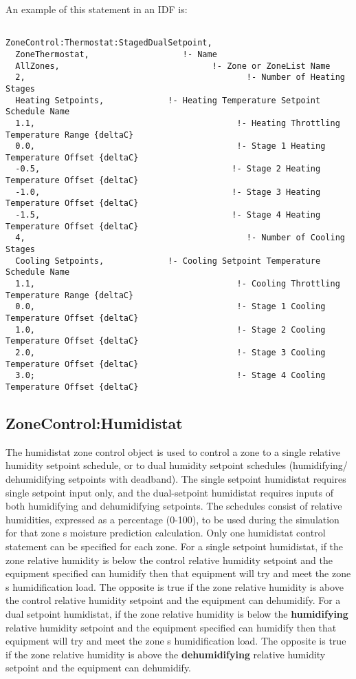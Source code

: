 An example of this statement in an IDF is:

\begin{lstlisting}

ZoneControl:Thermostat:StagedDualSetpoint,
  ZoneThermostat,                   !- Name
  AllZones,                               !- Zone or ZoneList Name
  2,                                             !- Number of Heating Stages
  Heating Setpoints,             !- Heating Temperature Setpoint Schedule Name
  1.1,                                         !- Heating Throttling Temperature Range {deltaC}
  0.0,                                         !- Stage 1 Heating Temperature Offset {deltaC}
  -0.5,                                       !- Stage 2 Heating Temperature Offset {deltaC}
  -1.0,                                       !- Stage 3 Heating Temperature Offset {deltaC}
  -1.5,                                       !- Stage 4 Heating Temperature Offset {deltaC}
  4,                                             !- Number of Cooling Stages
  Cooling Setpoints,             !- Cooling Setpoint Temperature Schedule Name
  1.1,                                         !- Cooling Throttling Temperature Range {deltaC}
  0.0,                                         !- Stage 1 Cooling Temperature Offset {deltaC}
  1.0,                                         !- Stage 2 Cooling Temperature Offset {deltaC}
  2.0,                                         !- Stage 3 Cooling Temperature Offset {deltaC}
  3.0;                                         !- Stage 4 Cooling Temperature Offset {deltaC}
\end{lstlisting}

\subsection{ZoneControl:Humidistat}\label{zonecontrolhumidistat}

The humidistat zone control object is used to control a zone to a single relative humidity setpoint schedule, or to dual humidity setpoint schedules (humidifying/ dehumidifying setpoints with deadband). The single setpoint humidistat requires single setpoint input only, and the dual-setpoint humidistat requires inputs of both humidifying and dehumidifying setpoints. The schedules consist of relative humidities, expressed as a percentage (0-100), to be used during the simulation for that zone s moisture prediction calculation. Only one humidistat control statement can be specified for each zone. For a single setpoint humidistat, if the zone relative humidity is below the control relative humidity setpoint and the equipment specified can humidify then that equipment will try and meet the zone s humidification load. The opposite is true if the zone relative humidity is above the control relative humidity setpoint and the equipment can dehumidify. For a dual setpoint humidistat, if the zone relative humidity is below the \textbf{humidifying} relative humidity setpoint and the equipment specified can humidify then that equipment will try and meet the zone s humidification load. The opposite is true if the zone relative humidity is above the \textbf{dehumidifying} relative humidity setpoint and the equipment can dehumidify.

